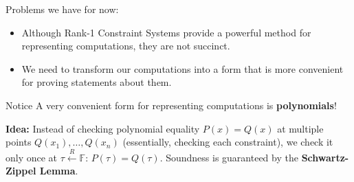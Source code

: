 \documentclass{zkdl-presentation-template}
\begin{document}
    \begin{frame}
        Problems we have for now: \pause
        \begin{itemize}[label=]
            \item Although Rank-1 Constraint Systems provide a powerful method for representing 
            computations, they are not succinct. \pause
            \item We need to transform our computations into a form that is more convenient for 
            proving statements about them.
        \end{itemize}

        \begin{alertblock}{Notice}
            A very convenient form for representing computations is \textbf{polynomials}!

            \vspace{10px}

            \textbf{Idea:} Instead of checking polynomial equality $P(x)=Q(x)$ at multiple points $Q(x_1),\ldots,Q(x_n)$ (essentially, checking each constraint), we check it only once at $\tau \xleftarrow{R} \mathbb{F}$: $P(\tau)=Q(\tau)$. Soundness is guaranteed by the \textbf{Schwartz-Zippel Lemma}.
        \end{alertblock}
    \end{frame}
\end{document}
